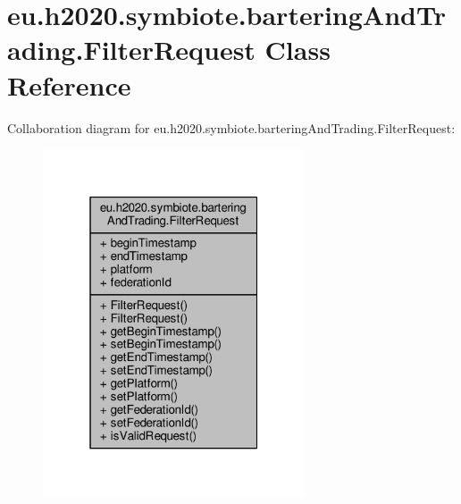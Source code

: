 \hypertarget{classeu_1_1h2020_1_1symbiote_1_1barteringAndTrading_1_1FilterRequest}{}\section{eu.\+h2020.\+symbiote.\+bartering\+And\+Trading.\+Filter\+Request Class Reference}
\label{classeu_1_1h2020_1_1symbiote_1_1barteringAndTrading_1_1FilterRequest}


Collaboration diagram for eu.\+h2020.\+symbiote.\+bartering\+And\+Trading.\+Filter\+Request\+:\nopagebreak
\begin{figure}[H]
\begin{center}
\leavevmode
\includegraphics[width=220pt]{classeu_1_1h2020_1_1symbiote_1_1barteringAndTrading_1_1FilterRequest__coll__graph}
\end{center}
\end{figure}
